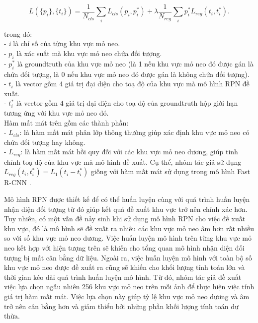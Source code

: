 {    \begin{equation}
        \label{eq:faster_rcnn_loss}
        L(\{p_i\}, \{t_i\}) = \frac{1}{N_{cls}}\sum_i L_{cls}(p_i, p^{*}_i) + \lambda\frac{1}{N_{reg}}\sum_i  p^{*}_i L_{reg}(t_i, t^{*}_i).
    \end{equation}

    \noindent
    trong đó: \\
    - \textit{i} là chỉ số của từng khu vực mỏ neo. \\
    - \textit{$p_i$} là xác suất mà khu vực mỏ neo chứa đối tượng. \\
    - \textit{$p^{*}_i$} là groundtruth của khu vực mỏ neo (là 1 nếu khu vực mỏ neo đó được gán là chứa đối tượng, là 0 nếu khu vực mỏ neo đó được gán là không chứa đối tượng). \\
    - \textit{$t_i$} là vector gồm 4 giá trị đại diện cho toạ độ của khu vực mà mô hình RPN đề xuất. \\
    - \textit{$t^{*}_i$} là vector gồm 4 giá trị đại diện cho toạ độ của groundtruth hộp giới hạn tương ứng với khu vực mỏ neo đó. \\
    Hàm mất mát trên gồm các thành phần: \\
    - \textit{$L_{cls}$}: là hàm mất mát phân lớp thông thường giúp xác định khu vực mỏ neo có chứa đối tượng hay không. \\
    - \textit{$L_{reg}$}: là hàm mất mát hồi quy đối với các khu vực mỏ neo dương, giúp tinh chỉnh toạ độ của khu vực mà mô hình đề xuất.
    Cụ thể, nhóm tác giả sử dụng $L_{reg}(t_i, t^{*}_i)=L_1(t_i - t^{*}_i)$ giống với hàm mất mát sử dụng trong mô hình Fast R-CNN \cite{girshick2015fast}.

    \noindent
    Mô hình RPN được thiết kế để có thể huấn luyện cùng với quá trình huấn luyện nhận diện đối tượng từ đó giúp kết quả đề xuất khu vực trở nên chính xác hơn.
    Tuy nhiên, có một vấn đề nảy sinh khi sử dụng mô hình RPN cho việc đề xuất khu vực, đó là mô hình sẽ đề xuất ra nhiều các khu vực mỏ neo âm hơn rất nhiều so với số khu vực mỏ neo dương.
    Việc huấn luyện mô hình trên từng khu vực mỏ neo kết hợp với hiện tượng trên sẽ khiến cho tổng quan mô hình nhận diện đối tượng bị mất cân bằng dữ liệu.
    Ngoài ra, việc huấn luyện mô hình với toàn bộ số khu vực mỏ neo được đề xuất ra cũng sẽ khiến cho khối lượng tính toán lớn và thời gian kéo dài quá trình huấn luyện mô hình.
    Từ đó, nhóm tác giả đề xuất việc lựa chọn ngẫu nhiên 256 khu vực mỏ neo trên mỗi ảnh để thực hiện việc tính giá trị hàm mất mát. Việc lựa chọn này giúp tỷ lệ khu vực mỏ neo dương và âm trở nên cân bằng hơn và giảm thiểu bởi những phần khối lượng tính toán dư thừa.

}
